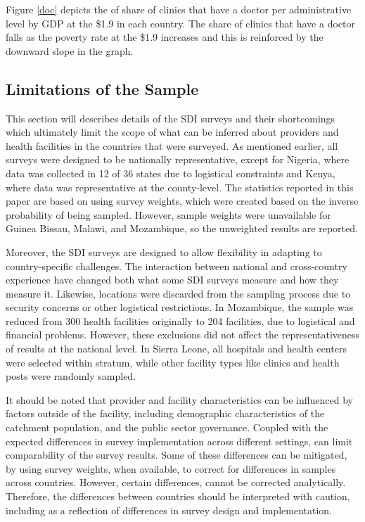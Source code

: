 \documentclass{article}                 %
\begin{document}
	Figure \ref{doc} depicts the of share of clinics that have a doctor per administrative level by GDP at the \$1.9 in each country. The share of clinics that have a doctor falls as the poverty rate at the \$1.9 increases and this is reinforced by the downward slope in the graph.
	
	
	
	\subsection{Limitations of the Sample}	
	
	This section will describes details of the SDI surveys and their shortcomings which ultimately limit the scope of what can be inferred about providers and health facilities in the countries that were surveyed. As mentioned earlier, all surveys were designed to be nationally representative, except for Nigeria, where data was collected in 12 of 36 states due to logistical constraints and Kenya, where data was representative at the county-level. The statistics reported in this paper  are based on using survey weights, which were created based on the inverse probability of being sampled. However, sample weights were unavailable for Guinea Bissau, Malawi, and Mozambique, so the unweighted results are reported. 
	
	Moreover, the SDI surveys are designed to allow flexibility in adapting to country-specific challenges. The interaction between national and cross-country experience  have changed both what some SDI surveys measure and how they measure it. Likewise, locations were discarded from the sampling process due to security concerns or other logistical restrictions. In  Mozambique, the sample was reduced from 300 health facilities originally to 204 facilities, due to logistical and financial problems. However, these exclusions did not affect the representativeness of results at the national level. In  Sierra Leone, all hospitals and health centers were selected within stratum, while other facility types like clinics and health posts were randomly sampled.
	
	It should be noted that provider and facility characteristics can be influenced by factors outside of the facility, including  demographic characteristics of the catchment population, and  the public sector governance. Coupled with the expected differences in survey implementation across different settings, can limit  comparability of the survey results. Some of these differences can be mitigated, by using survey weights, when available, to correct for differences in samples across countries. However, certain differences, cannot be corrected analytically. Therefore, the differences between countries should be interpreted with caution, including as a reflection of differences in survey design and implementation.
	
\end{document}
